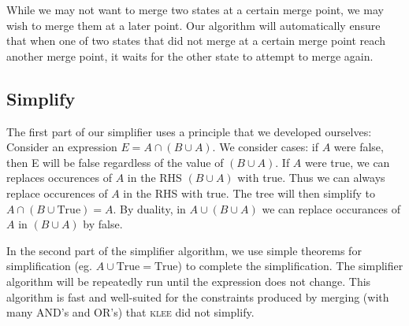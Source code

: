 \documentclass[12pt,a4paper]{article}
\newcommand{\klee}{\textsc{klee }}
\begin{document}
While we may not want to merge two states at a certain merge point, we may wish to merge them at a later point. Our algorithm will automatically ensure that when one of two states that did not merge at a certain merge point reach another merge point, it waits for the other state to attempt to merge again.

\subsection{Simplify}
The first part of our simplifier uses a principle that we developed ourselves:
Consider an expression $E = A\cap(B\cup A)$. We consider cases: if $A$ were false, then E will be false regardless of the value of $(B\cup A)$. If $A$ were true, we can replaces occurences of $A$ in the RHS $(B\cup A)$ with true. Thus we can always replace occurences of $A$ in the RHS with true. The tree will then simplify to $A\cap(B\cup \text{True}) = A$. By duality, in $A\cup(B\cup A)$ we can replace occurances of $A$ in $(B\cup A)$ by false.

In the second part of the simplifier algorithm, we use simple theorems for simplification (eg. $A\cup \text{True} = \text{True}$) to complete the simplification. The simplifier algorithm will be repeatedly run until the expression does not change. This algorithm is fast and well-suited for the constraints produced by merging (with many AND's and OR's) that \klee did not simplify.
\end{document}
